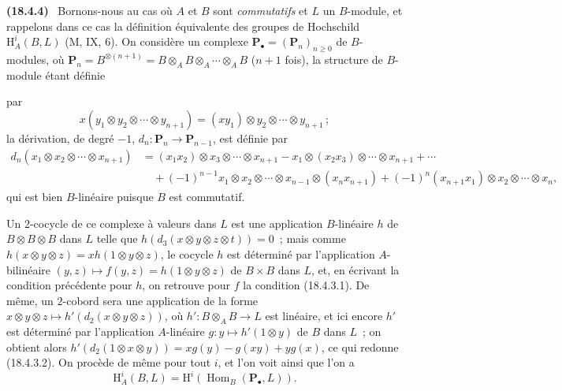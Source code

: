 \documentclass[10pt,oneside]{book}
\makeatletter
\newcommand{\setmanualcurrentlabel}[1]{\def\@currentlabel{#1}}
\newcommand{\oldpage}[2][]{%
  \setcounter{footnote}{0}%
  \marginpar{\scriptsize\textbf{#1}~|~#2}\ignorespaces}
\newenvironment{env}[1][]{\setmanualcurrentlabel{#1}\par\medskip\noindent\textbf{(#1)}\ }{\par}
\makeatother
\begin{document}
\begin{env}[18.4.4]
\label{0.18.4.4-fr}
Bornons-nous au cas où $A$ et $B$ sont \emph{commutatifs} et $L$ un
$B$-module, et rappelons dans ce cas la définition équivalente des groupes de
Hochschild $\mathrm H_A^i(B,L)$ (M, IX, 6). On considère un complexe
$\mathbf P_\bullet=(\mathbf P_n)_{n\geqslant0}$ de $B$-modules, où
$\mathbf P_n=B^{\otimes(n+1)}=B\otimes_A B\otimes_A\cdots\otimes_A B$
($n+1$ fois), la structure de $B$-module étant définie

\oldpage[0\textsubscript{IV-1}]{66}

par
\[
  x(y_1\otimes y_2\otimes\cdots\otimes y_{n+1})
  =(xy_1)\otimes y_2\otimes\cdots\otimes y_{n+1}\,;
\]
la dérivation, de degré $-1$, $d_n:\mathbf P_n\to\mathbf P_{n-1}$, est
définie par
\begin{align*}
  d_n(x_1\otimes x_2\otimes\cdots\otimes x_{n+1})
    &=(x_1x_2)\otimes x_3\otimes\cdots\otimes x_{n+1}
      -x_1\otimes(x_2x_3)\otimes\cdots\otimes x_{n+1}+\cdots\\
    &\quad+(-1)^{n-1}x_1\otimes x_2\otimes\cdots\otimes x_{n-1}
      \otimes(x_nx_{n+1})
      +(-1)^n(x_{n+1}x_1)\otimes x_2\otimes\cdots\otimes x_n,
\end{align*}
qui est bien $B$-linéaire puisque $B$ est commutatif.

Un $2$-cocycle de ce complexe à valeurs dans $L$ est une application
$B$-linéaire $h$ de $B\otimes B\otimes B$ dans $L$ telle que
$h(d_3(x\otimes y\otimes z\otimes t))=0$~; mais comme
$h(x\otimes y\otimes z)=xh(1\otimes y\otimes z)$, le cocycle $h$ est déterminé
par l'application $A$-bilinéaire
$(y,z)\longmapsto f(y,z)=h(1\otimes y\otimes z)$ de $B\times B$ dans $L$, et,
en écrivant la condition précédente pour $h$, on retrouve pour $f$ la
condition (18.4.3.1). De même, un $2$-cobord sera une application de la forme
$x\otimes y\otimes z\longmapsto h'(d_2(x\otimes y\otimes z))$, où
$h':B\otimes_A B\to L$ est linéaire, et ici encore $h'$ est déterminé par
l'application $A$-linéaire $g:y\longmapsto h'(1\otimes y)$ de $B$ dans $L$~;
on obtient alors
$h'(d_2(1\otimes x\otimes y))=xg(y)-g(xy)+yg(x)$, ce qui redonne (18.4.3.2).
On procède de même pour tout $i$, et l'on voit ainsi que l'on a
\begin{equation}
\label{0.18.4.4.1-fr}
\tag{18.4.4.1}
  \mathrm H_A^i(B,L)=\mathrm H^i(\operatorname{Hom}_B(\mathbf P_\bullet,L)).
\end{equation}
\end{env}
\end{document}
